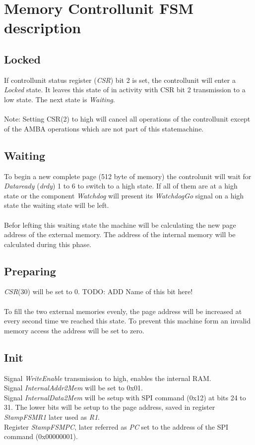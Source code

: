\section{Memory Controllunit FSM description}
\subsection{Locked} 
If controllunit status register (\textit{CSR}) bit 2 is set, the controllunit will enter a \textit{Locked} state. It leaves this state of in activity with CSR bit 2 transmission to a low state. The next state is \textit{Waiting}. \\\\
Note: Setting CSR(2) to high will cancel all operations of the controllunit except of the AMBA operations which are not part of this statemachine. 
\subsection{Waiting} 
To begin a new complete page (512 byte of memory) the controlunit will wait for \textit{Dataready} (\textit{drdy}) 1 to 6 to switch to a high state. If all of them are at a high state or the component \textit{Watchdog} will present its \textit{WatchdogGo} signal on a high state the waiting state will be left. \\\\
Befor lefting this waiting state the machine will be calculating the new page address of the external memory. The address of the internal memory will be calculated during this phase. 
\subsection{Preparing} 
\textit{CSR}(30) will be set to 0. TODO: ADD Name of this bit here! \\\\
To fill the two external memories evenly, the page address will be increased at every second time we reached this state. To prevent this machine form an invalid memory access the address will be set to zero. 
\subsection{Init}
Signal \textit{WriteEnable} transmission to high, enables the internal RAM.\\
Signal \textit{InternalAddr2Mem} will be set to 0x01. \\
Signal \textit{InternalData2Mem} will be setup with SPI command (0x12) at bits 24 to 31. The lower bits will be setup to the page address, saved in register \textit{StampFSMR1} later used as \textit{R1}. \\
Register \textit{StampFSMPC}, later referred as \textit{PC} set to the address of the SPI command (0x00000001). 
